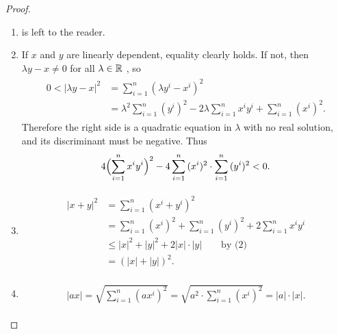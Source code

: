 \begin{proof}
    \begin{enumerate}[label={\upshape(\arabic*)}]
        \item is left to the reader.
        \item If $x$ and $y$ are linearly dependent, equality clearly holds.
            If not, then $\lambda y - x\neq 0$  for all $\lambda\in \mathbb{R}$ , so
            \begin{align*}\begin{aligned}
                0 < |\lambda y - x|^2 
                & = \sum_{i=1 }^{n }{(\lambda y^i - x^i)^2} \\
                & = \lambda^2 \sum_{i=1 }^{n }{(y^i)^2 - 2\lambda \sum_{i=1 }^{n }{x^iy^i}} + \sum_{i=1 }^{n }{(x^i)^2}.
            \end{aligned}\end{align*}
            Therefore the right side is a quadratic equation in $\lambda$ with no
            real solution, and its discriminant must be negative. Thus
            \begin{align*}
                4\Bigl(\sum_{i=1 }^{n }{x^iy^i}\Bigr)^2 - 4 \sum_{i=1 }^{n }{(x^i)^2}\cdot \sum_{i=1 }^{n }{(y^i)^2} < 0.
            \end{align*}
        \item \quad \vspace*{-2.75em}
            \begin{align*}\begin{aligned}
                \left|x+y\right|^2 
                & = \sum_{i=1 }^{n }{(x^i + y^i)^2} \\
                & = \sum_{i=1 }^{n }{(x^i)^2} + \sum_{i=1 }^{n }{(y^i)^2} +  2\sum_{i=1 }^{n }{x^iy^i} \\
                & \le |x|^2 + |y|^2 + 2|x|\cdot |y| \qquad \text{by (2)}\\
                & = \left(|x| + |y|\right)^2.
            \end{aligned}\end{align*}
        \item %
            \begin{align*}\begin{aligned}
                |ax| 
                = \sqrt{\sum_{i=1 }^{n }{(ax^i)^2}} 
                = \sqrt{a^2\cdot \sum_{i=1}^{n }{(x^i)^2}}
                = |a|\cdot |x|.
            \end{aligned}\end{align*}
    \end{enumerate}
\end{proof}

